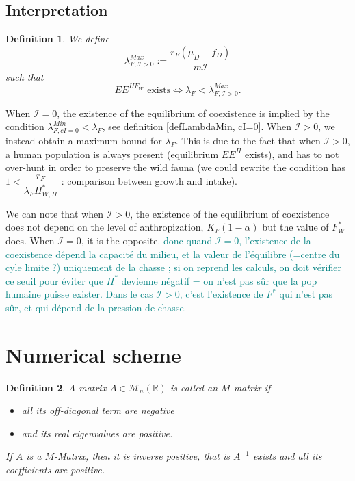 \documentclass{article}
\newcommand{\lfw}{\lambda_{F}}
\newcommand{\lfw}{\lambda_{F}}
\newcommand{\cI}{\mathcal{I}}
\newcommand{\marc}[1]{\textcolor{teal}{#1}}
\newtheorem{definition}{Definition}
\begin{document}
\subsection{Interpretation}

\begin{definition}
We define 
$$\lambda_{F, \cI>0}^{Max} := \dfrac{r_F(\mu_D - f_D)}{m \cI}$$
such that 
$$
\text{$EE^{HF_W}$ exists} \Leftrightarrow  \lfw < \lambda_{F, \cI>0}^{Max}.
$$
\end{definition}

When $\cI = 0$, the existence of the equilibrium of coexistence is implied by the condition $\lambda_{F, cI = 0}^{Min} < \lfw$, see definition \ref{defLambdaMin, cI=0}. When $\cI > 0$, we instead obtain a maximum bound for $\lfw$. This is due to the fact that when $\cI > 0$, a human population is always present (equilibrium $EE^{H}$ exists), and has to not over-hunt in order to preserve the wild fauna (we could rewrite the condition has $1 < \dfrac{r_F}{\lfw H^*_{W, H}}$ : comparison between growth and intake).


We can note that when $\cI > 0$, the existence of the equilibrium of coexistence does not depend on the level of anthropization, $K_F(1-\alpha)$ but the value of $F^*_W$ does. When $\cI = 0$, it is the opposite. 
\marc{donc quand $\cI =0$, l'existence de la coexistence dépend la capacité du milieu, et la valeur de l'équilibre (=centre du cyle limite ?) uniquement de la chasse ; si on reprend les calculs, on doit vérifier ce seuil pour éviter que $H^*$ devienne négatif = on n'est pas sûr que la pop humaine puisse exister. Dans le cas $\cI > 0$, c'est l'existence de $F^*$ qui n'est pas sûr, et qui dépend de la pression de chasse.}

\section{Numerical scheme}
\begin{definition} A matrix $A \in \mathcal{M}_n (\mathbb{R})$ is called an $M$-matrix if\begin{itemize}
\item all its off-diagonal term are negative
\item and its real eigenvalues are positive.
\end{itemize}

If $A$ is a $M$-Matrix, then it is inverse positive, that is $A^{-1}$ exists and all its coefficients are positive.


\end{definition}
\end{document}
